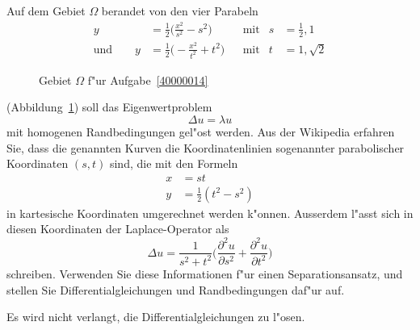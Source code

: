 Auf dem Gebiet $\Omega$ berandet von den vier Parabeln
\[
\begin{aligned}
y&=\frac12\biggl( \frac{x^2}{s^2}-s^2\biggr)&&\text{mit}&s&=\frac12,1\\
\text{und}\qquad
y&=\frac12\biggl(-\frac{x^2}{t^2}+t^2\biggr)&&\text{mit}&t&=1,\sqrt{2}
\end{aligned}
\]
\begin{figure}
\centering
{}
\caption{Gebiet $\Omega$ f"ur Aufgabe~\ref{40000014}
\label{40000014:domain}}
\end{figure}
(Abbildung~\ref{40000014:domain})
soll das Eigenwertproblem
\begin{equation}
\Delta u = \lambda u
\label{40000014:dgl}
\end{equation}
mit homogenen Randbedingungen gel"ost werden.
Aus der Wikipedia erfahren Sie, dass die genannten Kurven 
die Koordinatenlinien sogenannter parabolischer Koordinaten $(s,t)$ sind,
die mit den Formeln
\begin{align*}
x&=st\\
y&=\frac12(t^2-s^2)
\end{align*}
in kartesische Koordinaten umgerechnet werden k"onnen.
Ausserdem l"asst sich in diesen Koordinaten der Laplace-Operator als
\[
\Delta u = \frac1{s^2 + t^2}\biggl(\frac{\partial^2 u}{\partial s^2}+\frac{\partial^2u}{\partial t^2}\biggr)
\]
schreiben.
Verwenden Sie diese Informationen f"ur einen Separationsansatz, und
stellen Sie Differentialgleichungen und Randbedingungen daf"ur auf.

\begin{hinweis}
Es wird nicht verlangt, die Differentialgleichungen zu l"osen.
\end{hinweis}

